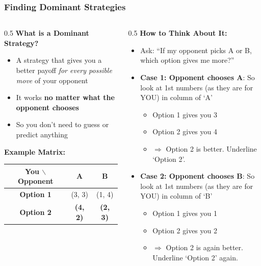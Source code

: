 \begin{frame}[fragile]\frametitle{Finding Dominant Strategies}
\begin{columns}
    \begin{column}[T]{0.5\linewidth}
      \textbf{What is a Dominant Strategy?}
      \begin{itemize}
        \item A strategy that gives you a better payoff \textit{for every possible move} of your opponent
        \item It works \textbf{no matter what the opponent chooses}
        \item So you don't need to guess or predict anything
      \end{itemize}
      
      \vspace{6pt}
      \textbf{Example Matrix:}
      \begin{center}
      \begin{tabular}{|c|c|c|}
        \hline
        \textbf{You $\backslash$ Opponent} & \textbf{A} & \textbf{B} \\
        \hline
        \textbf{Option 1} & (3, 3) & (1, 4) \\
        \hline
        \textbf{\textbf{Option 2}} & \textbf{(4, 2)} & \textbf{(2, 3)} \\
        \hline
      \end{tabular}
      \end{center}
    \end{column}
    \begin{column}[T]{0.5\linewidth}
      \textbf{How to Think About It:}
      \begin{itemize}
        \item Ask: “If my opponent picks A or B, which option gives me more?”
        
        \item \textbf{Case 1: Opponent chooses A}: So look at 1st numbers (as they are for YOU) in column of `A'
        \begin{itemize}
          \item Option 1 gives you 3
          \item Option 2 gives you 4
          \item $\Rightarrow$ Option 2 is better. Underline `Option 2'.
        \end{itemize}
        
        \item \textbf{Case 2: Opponent chooses B}: So look at 1st numbers (as they are for YOU) in column of `B'
        \begin{itemize}
          \item Option 1 gives you 1
          \item Option 2 gives you 2
          \item $\Rightarrow$ Option 2 is again better. Underline `Option 2' again.
        \end{itemize}
        

\end{itemize}
\end{column}
\end{columns}
\end{frame}
